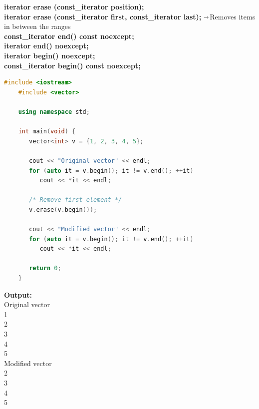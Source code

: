 \documentclass[12pt , a4paper]{article}
\newcommand{\hl}[1]{\colorbox{coolblack}{\color{cream}\textbf{#1}\color{black}}}
\newcommand{\arrow}{$\shortrightarrow$}
\begin{document}
	\hl{iterator erase (const\_iterator position);}\\
	\hl{iterator erase (const\_iterator first, const\_iterator last);} \arrow Removes items in between the ranges\\
	\hl{const\_iterator end() const noexcept;}\\
	\hl{iterator end() noexcept;}\\
	\hl{iterator begin() noexcept;}\\
	\hl{const\_iterator begin() const noexcept;}
	\begin{lstlisting}[language=C++]
	#include <iostream>
	#include <vector>
	
	using namespace std;
	
	int main(void) {
	   vector<int> v = {1, 2, 3, 4, 5};
	
	   cout << "Original vector" << endl;
	   for (auto it = v.begin(); it != v.end(); ++it)
	      cout << *it << endl;
	
	   /* Remove first element */
	   v.erase(v.begin());
	
	   cout << "Modified vector" << endl;
	   for (auto it = v.begin(); it != v.end(); ++it)
	      cout << *it << endl;
	
	   return 0;
	}
	\end{lstlisting}

	\begin{tcolorbox}
	\textbf{Output:}\\
	Original vector\\
	1\\
	2\\
	3\\
	4\\
	5\\
	Modified vector\\
	2\\
	3\\
	4\\
	5
	\end{tcolorbox}


\end{document}
